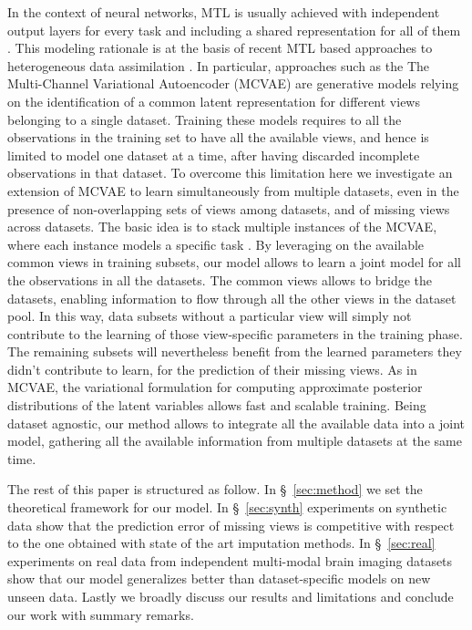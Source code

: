 In the context of neural networks, MTL is usually achieved with independent output layers for every task and including a shared representation for all of them \citep{Dorado-Moreno2020}.
This modeling rationale is at the basis of recent MTL based approaches to heterogeneous data assimilation \citep{Wu2018, Antelmi2019, Shi2019}.
In particular, approaches such as the The Multi-Channel Variational Autoencoder (MCVAE) \citep{Antelmi2019} are generative models relying on the identification of a common latent representation for different views belonging to a single dataset.
Training these models requires to all the observations in the training set to have all the available views, and hence is limited to model one dataset at a time, after having discarded incomplete observations in that dataset.
%
To overcome this limitation here we investigate an extension of MCVAE to learn simultaneously from multiple datasets, even in the presence of non-overlapping sets of views among datasets, and of missing views across datasets.
The basic idea is to stack multiple instances of the MCVAE, where each instance models a specific task .
By leveraging on the available common views in training subsets, our model allows to learn a joint model for all the observations in all the datasets.
The common views allows to bridge the datasets, enabling information to flow through all the other views in the dataset pool.
In this way, data subsets without a particular view will simply not contribute to the learning of those view-specific parameters in the training phase.
The remaining subsets will nevertheless benefit from the learned parameters they didn't contribute to learn, for the prediction of their missing views.
As in MCVAE, the variational formulation for computing approximate posterior distributions of the latent variables allows fast and scalable training.
Being dataset agnostic, our method allows to integrate all the available data into a joint model, gathering  all the available information from multiple datasets at the same time.

The rest of this paper is structured as follow.
In \S~\ref{sec:method} we set the theoretical framework for our model.
In \S~\ref{sec:synth} experiments on synthetic data show that the prediction error of missing views is competitive with respect to the one obtained with state of the art imputation methods.
In \S~\ref{sec:real} experiments on real data from independent multi-modal brain imaging datasets show that our model generalizes better than dataset-specific models on new unseen data.
Lastly we broadly discuss our results and limitations and conclude our work with summary remarks.

